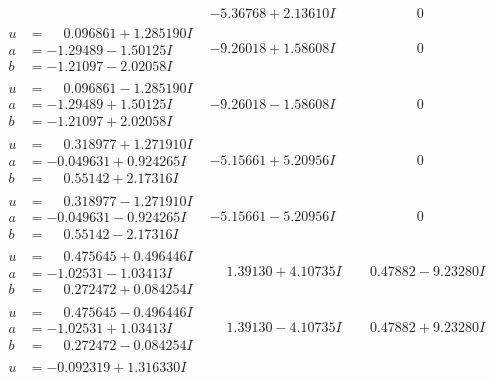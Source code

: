 \documentclass[1p]{elsarticle_modified}
\theoremstyle{definition}
\begin{document}
$$\begin{array}{c|c|c}
 & -5.36768 + 2.13610 I & \phantom{-0.000000 } 0 \\ \hline\begin{aligned}
u &= \phantom{-}0.096861 + 1.285190 I \\
a &= -1.29489 - 1.50125 I \\
b &= -1.21097 - 2.02058 I\end{aligned}
 & -9.26018 + 1.58608 I & \phantom{-0.000000 } 0 \\ \hline\begin{aligned}
u &= \phantom{-}0.096861 - 1.285190 I \\
a &= -1.29489 + 1.50125 I \\
b &= -1.21097 + 2.02058 I\end{aligned}
 & -9.26018 - 1.58608 I & \phantom{-0.000000 } 0 \\ \hline\begin{aligned}
u &= \phantom{-}0.318977 + 1.271910 I \\
a &= -0.049631 + 0.924265 I \\
b &= \phantom{-}0.55142 + 2.17316 I\end{aligned}
 & -5.15661 + 5.20956 I & \phantom{-0.000000 } 0 \\ \hline\begin{aligned}
u &= \phantom{-}0.318977 - 1.271910 I \\
a &= -0.049631 - 0.924265 I \\
b &= \phantom{-}0.55142 - 2.17316 I\end{aligned}
 & -5.15661 - 5.20956 I & \phantom{-0.000000 } 0 \\ \hline\begin{aligned}
u &= \phantom{-}0.475645 + 0.496446 I \\
a &= -1.02531 - 1.03413 I \\
b &= \phantom{-}0.272472 + 0.084254 I\end{aligned}
 & \phantom{-}1.39130 + 4.10735 I & \phantom{-}0.47882 - 9.23280 I \\ \hline\begin{aligned}
u &= \phantom{-}0.475645 - 0.496446 I \\
a &= -1.02531 + 1.03413 I \\
b &= \phantom{-}0.272472 - 0.084254 I\end{aligned}
 & \phantom{-}1.39130 - 4.10735 I & \phantom{-}0.47882 + 9.23280 I \\ \hline\begin{aligned}
u &= -0.092319 + 1.316330 I \\

\end{aligned}
\end{array}$$
\end{document}
